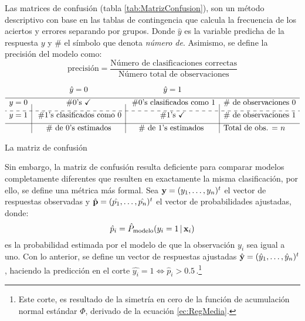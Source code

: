 \documentclass[../Main/Main.tex]{subfiles}
\begin{document}
Las matrices de confusión (tabla \ref{tab:MatrizConfusion}), son un método descriptivo con base en las tablas de contingencia que calcula la frecuencia de los aciertos y errores separando por grupos. Donde $\hat{y}$ es la variable predicha de la respuesta $y$ y $\#$ el símbolo que denota \textit{número de}. Asimismo, se define la precisión del modelo como:
$$ \text{precisión} = \dfrac{\text{Número de clasificaciones correctas}}{\text{Número total de observaciones}}$$

\begin{table}[H]
\centering
$\begin{array}{c|c|c|l}
~ & \hat{y} = 0 & \hat{y} = 1 & ~ \\[4pt]
\hline
y = 0 & \#0\text{'s } \checkmark & \;\# 0\text{'s clasificados como }1 & \#\text{ de observaciones 0} \\[4pt]
\cdashline{1-4}
y = 1 & \;\# 1\text{'s clasificados como }0 & \# 1\text{'s } \checkmark & \#\text{ de observaciones 1} \\[4pt]
\hline
~ & \# \text{ de 0's estimados} & \# \text{ de 1's estimados } &  \text{Total de obs. = } n
\end{array}$
\caption{La matriz de confusión}
\label{tab:MatrizConfusion}
\end{table}

Sin embargo, la matriz de confusión resulta deficiente para comparar modelos completamente diferentes que resulten en exactamente la misma clasificación, por ello, se define una métrica más formal. Sea $\mathbf{y} = (y_1,\ldots,y_n)^t$ el vector de respuestas observadas y \linebreak $\hat{\mathbf{p}} = (\hat{p_1},\ldots,\hat{p_n})^t$ el vector de probabilidades ajustadas, donde: $$\hat{p}_i = \hat{P}_{\text{modelo}}(y_i = 1\,|\,\mathbf{x}_i)$$ es la probabilidad estimada por el modelo de que la observación $y_i$ sea igual a uno. Con lo anterior, se define un vector de respuestas ajustadas $\hat{\mathbf{y}} = (\hat{y}_1,\ldots,\hat{y}_n)^t$, haciendo la predicción en el corte $\hat{y_i} = 1 \iff \hat{p}_i > 0.5\,$.\footnote{Este corte, es resultado de la simetría en cero de la función de acumulación normal estándar $\Phi$, derivado de la ecuación \eqref{ec:RegMedia}.} \\
\end{document}
